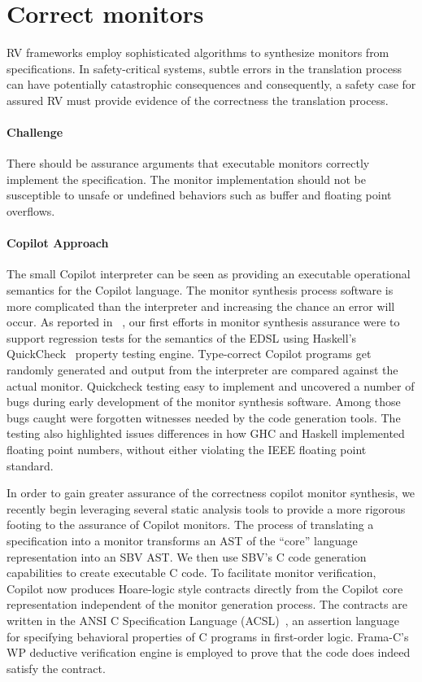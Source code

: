 \section{Correct monitors} \label{sec:codecorrect} 
 RV frameworks employ sophisticated algorithms to synthesize  monitors
 from specifications. In safety-critical systems, subtle errors in the
 translation process can have potentially catastrophic
 consequences and consequently, a safety case for assured RV must
 provide evidence of the correctness the translation process. 


\paragraph{Challenge} There should be assurance arguments that
executable monitors correctly implement the specification.  The monitor implementation
should not be susceptible to unsafe or undefined behaviors such as
buffer and floating point overflows. 

\paragraph{Copilot Approach}    
The  small  Copilot interpreter can be seen as providing an executable
operational semantics for the Copilot language. The monitor synthesis
process software is more complicated  than the interpreter and
increasing the chance an error will occur.  As reported
in~\cite{pike-icfp-12} , our first efforts in monitor
synthesis assurance were  to support  regression tests for the semantics
of the EDSL using Haskell's QuickCheck~\cite{qc} property testing
engine. Type-correct Copilot programs get randomly generated and
output from the interpreter are compared against the actual
monitor. Quickcheck testing easy to implement and uncovered 
a number of bugs during early development of the monitor synthesis
software. Among those bugs caught were forgotten witnesses needed by
the code generation tools. The testing also highlighted issues
differences in how GHC and Haskell implemented floating point numbers,
without either violating the IEEE floating point standard. 


In order to gain greater assurance of the correctness copilot monitor
synthesis, we recently begin leveraging several static analysis tools
to provide a more rigorous footing to the assurance of Copilot
monitors.  The process of translating a specification into a monitor
transforms an AST of the ``core'' language representation into an SBV
AST.  We then use SBV's C code generation capabilities to create
executable C code.  To facilitate monitor verification, Copilot now
produces Hoare-logic style contracts directly from the Copilot core
representation independent of the monitor generation process. The
contracts are written in the ANSI C Specification Language
(ACSL)~\cite{baudin09acsl}, an assertion language for specifying
behavioral properties of C programs in first-order logic.
Frama-C's~\cite{framac} WP deductive verification engine is employed
to prove that the code does indeed satisfy the contract.   

